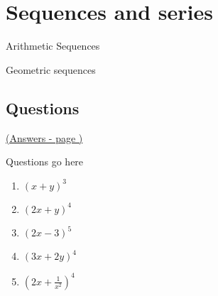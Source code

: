 \documentclass[../main.tex]{subfiles}
\begin{document}
\section{Sequences and series}

Arithmetic Sequences

Geometric sequences


\pagebreak
\hypertarget{sequenceslink}{\subsection*{Questions}}
\hyperlink{sequencesanswers}{(Answers - page {\pageref*{Sequences answers}})}

\label{Sequences}
Questions go here


\begin{enumerate}
    \item \( (x+y)^3 \)
    \item \( (2x+y)^4 \)
    \item \( (2x-3)^5 \)
    \item \( (3x+2y)^4 \)
    \item \( (2x + \frac{1}{x^2 } )^4 \)
\end{enumerate}
\end{document}
